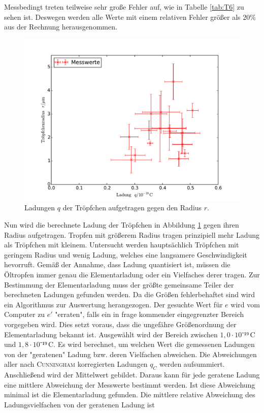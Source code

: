 Messbedingt treten teilweise sehr große Fehler auf, wie in Tabelle \ref{tab:T6} zu sehen ist. Deswegen werden alle Werte mit einem relativen Fehler größer als $20\%$ aus der Rechnung herausgenommen.
\begin{figure}
	\centering
	\includegraphics[width=\textwidth]{Bilder/plot_messwerte.pdf}
	\caption{Ladungen $q$ der Tröpfchen aufgetragen gegen den Radius $r$.}
	\label{fig:1}
\end{figure}
Nun wird die berechnete Ladung der Tröpfchen in Abbildung \ref{fig:1} gegen ihren Radius aufgetragen. Tropfen mit größerem Radius tragen prinzipiell mehr Ladung als Tröpfchen mit kleinem. Untersucht werden hauptsächlich Tröpfchen mit geringem Radius und wenig Ladung, welches eine langsamere Geschwindigkeit hevorruft.
Gemäß der Annahme, dass Ladung quantisiert ist, müssen die Öltropfen immer genau die Elementarladung oder ein Vielfaches derer tragen. Zur Bestimmung der Elementarladung muss der größte gemeinsame Teiler der berechneten Ladungen gefunden werden. Da die Größen fehlerbehaftet sind wird ein Algorithmus zur Auswertung herangezogen.
Der gesuchte Wert für $e$ wird vom Computer zu $e'$ "erraten", falls ein in frage kommender eingegrenzter Bereich vorgegeben wird. Dies setzt voraus, dass die ungefähre Größenordnung der Elementarladung bekannt ist. Ausgewählt wird der Bereich zwischen $1,0\cdot 10⁻¹⁹\,\si\coulomb$ und $1,8\cdot 10⁻¹⁹\,\si\coulomb$. Es wird berechnet, um welchen Wert die gemessenen Ladungen von der "geratenen" Ladung bzw. deren Vielfachen abweichen. Die Abweichungen aller nach \textsc{Cunningham} korregierten Ladungen $q_C$ werden aufsummiert. Anschließend wird der Mittelwert gebildet. Daraus kann für jede geratene Ladung eine mittlere Abweichung der Messwerte bestimmt werden. Ist diese Abweichung minimal ist die Elementarladung gefunden. Die mittlere relative Abweichung des Ladungsvielfachen von der geratenen Ladung ist

